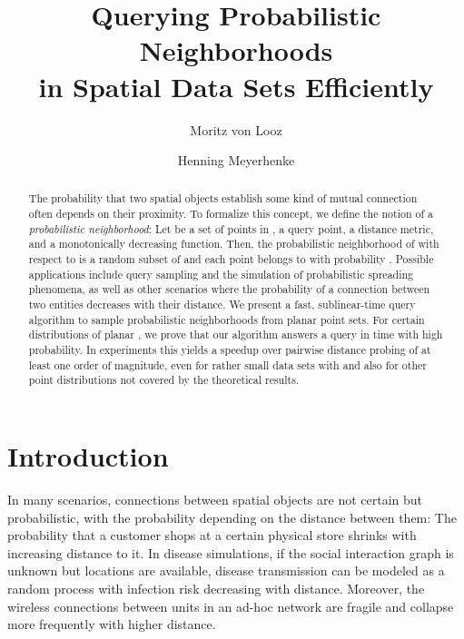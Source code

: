 \documentclass{llncs}
\begin{document}
\title{Querying Probabilistic Neighborhoods \\ in Spatial Data Sets Efficiently}
\author{Moritz von Looz \and Henning Meyerhenke}




\maketitle

\begin{abstract}
The probability that two spatial objects establish some kind of mutual connection often depends on their proximity.
To formalize this concept, we define the notion of a \emph{probabilistic neighborhood}:
Let  be a set of  points in ,   a query point,  a distance metric, and  a monotonically decreasing function.
Then, the probabilistic neighborhood  of  with respect to  is 
a random subset of  and each point  belongs to  with probability .
Possible applications include query sampling and the simulation of probabilistic spreading phenomena, as well as other scenarios where the probability of a connection between two entities decreases with their distance.
We present a fast, sublinear-time query algorithm to sample probabilistic neighborhoods from planar point sets.
For certain distributions of planar , we prove that our algorithm answers a query in  time with high probability.
In experiments this yields a speedup over pairwise distance probing of at least one order of magnitude, even for rather small data sets with  and also for other point distributions not covered by the theoretical results.


\end{abstract}


\section{Introduction}
\label{sec:introduction}


In many scenarios, connections between spatial objects are not certain but probabilistic, with the probability depending on the distance between them:
The probability that a customer shops at a certain physical store shrinks with increasing distance to it.
In disease simulations, if the social interaction graph is unknown but locations are available, disease transmission 
can be modeled as a random process with infection risk decreasing with distance.
Moreover, the wireless connections between units in an ad-hoc network are fragile and collapse more frequently with higher 
distance. 
\end{document}
